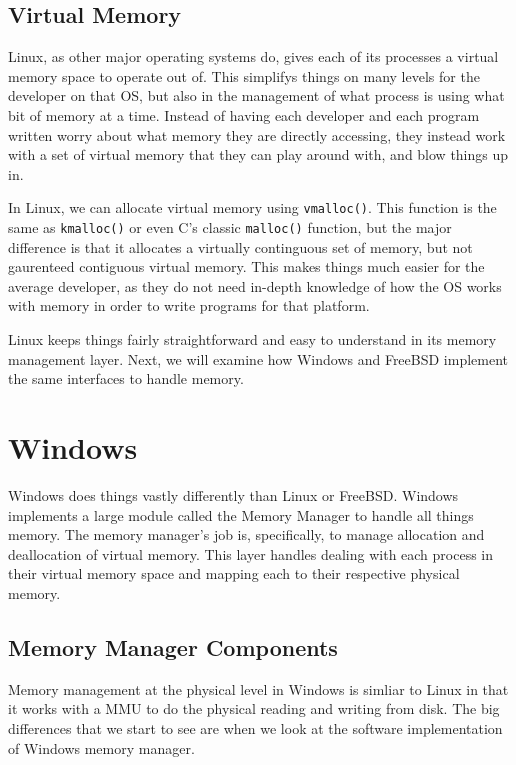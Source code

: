    \subsection{Virtual Memory}
   	Linux, as other major operating systems do, gives each of its processes
	a virtual memory space to operate out of. This simplifys things on many
	levels for the developer on that OS, but also in the management of what
	process is using what bit of memory at a time. Instead of having each
	developer and each program written worry about what memory they are
	directly accessing, they instead work with a set of virtual memory that
	they can play around with, and blow things up in.

	In Linux, we can allocate virtual memory using \texttt{vmalloc()}. This
	function is the same as \texttt{kmalloc()} or even C's classic \texttt{malloc()}
	function, but the major difference is that it allocates a virtually
	continguous set of memory, but not gaurenteed contiguous virtual memory.
	This makes things much easier for the average developer, as they do not
	need in-depth knowledge of how the OS works with memory in order to write
	programs for that platform.

	Linux keeps things fairly straightforward and easy to understand in its
	memory management layer. Next, we will examine how Windows and FreeBSD
	implement the same interfaces to handle	memory.
  \section{Windows}
  Windows does things vastly differently than Linux or FreeBSD. Windows implements
  a large module called the Memory Manager to handle all things memory. The memory
  manager's job is, specifically, to manage allocation and deallocation of virtual
  memory. This layer handles dealing with each process in their virtual memory space
  and mapping each to their respective physical memory.
  \subsection{Memory Manager Components}
  Memory management at the physical level in Windows is simliar to Linux in that it
  works with a MMU to do the physical reading and writing from disk. The big
  differences that we start to see are when we look at the software implementation
  of Windows memory manager.

